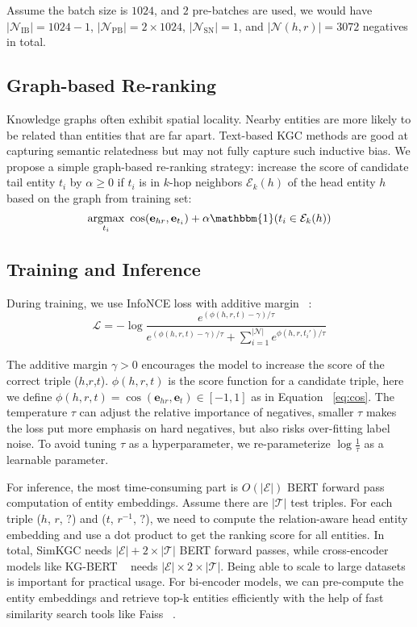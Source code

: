 \documentclass[11pt]{article}
\begin{document}
Assume the batch size is $1024$,
and $2$ pre-batches are used,
we would have $|\mathcal{N}_\text{IB}| = 1024 - 1$,
$|\mathcal{N}_\text{PB}| = 2 \times 1024$,
$|\mathcal{N}_\text{SN}| = 1$,
and $|\mathcal{N}(h,r)| = 3072$ negatives in total.

\subsection{Graph-based Re-ranking}

Knowledge graphs often exhibit spatial locality.
Nearby entities are more likely to be related than entities that are far apart.
Text-based KGC methods are good at capturing semantic relatedness
but may not fully capture such inductive bias.
We propose a simple graph-based re-ranking strategy:
increase the score of candidate tail entity $t_i$
by $\alpha \ge 0$ if $t_i$ is in $k$-hop neighbors $\mathcal{E}_k(h)$
of the head entity $h$ based on the graph from training set:
\begin{equation} \label{eq:rerank}
\underset{t_i}{\mathrm{argmax}}\ \cos(\mathbf{e}_{hr},\mathbf{e}_{t_i}) + \alpha\mathbbm{1}(t_i \in \mathcal{E}_k(h))
\end{equation}

\subsection{Training and Inference}
During training,
we use InfoNCE loss with additive margin ~\citep{chen2020simple,yang2019improving}:
\begin{equation} \label{eq:infonce}
    \mathcal{L} = -\log \frac{e^{(\phi(h,r,t)-\gamma)/\tau}}
    {e^{(\phi(h,r,t)-\gamma)/\tau} + \sum_{i=1}^{|\mathcal{N}|}{e^{\phi(h,r,t_i')/\tau}}}
\end{equation}

The additive margin $\gamma > 0$ encourages the model
to increase the score of the correct triple ($h$,$r$,$t$).
$\phi(h,r,t)$ is the score function for a candidate triple,
here we define $\phi(h,r,t)=\cos(\mathbf{e}_{hr}, \mathbf{e}_{t}) \in [-1,1]$
as in Equation ~\ref{eq:cos}.
The temperature $\tau$ can adjust the relative importance of negatives,
smaller $\tau$ makes the loss put more emphasis on hard negatives,
but also risks over-fitting label noise.
To avoid tuning $\tau$ as a hyperparameter,
we re-parameterize $\log \frac{1}{\tau}$ as a learnable parameter.

For inference,
the most time-consuming part is $O(|\mathcal{E}|)$ BERT forward pass computation of entity embeddings.
Assume there are $|\mathcal{T}|$ test triples.
For each triple ($h$, $r$, $?$) and ($t$, $r^{-1}$, $?$),
we need to compute the relation-aware head entity embedding
and use a dot product to get the ranking score for all entities.
In total,
SimKGC needs $|\mathcal{E}|+2\times|\mathcal{T}|$ BERT forward passes,
while cross-encoder models like KG-BERT ~\citep{yao2019kg}
needs $|\mathcal{E}|\times2\times|\mathcal{T}|$.
Being able to scale to large datasets is important for practical usage.
For bi-encoder models,
we can pre-compute the entity embeddings
and retrieve top-k entities efficiently
with the help of fast similarity search tools like Faiss ~\citep{Johnson2021BillionScaleSS}.
\end{document}
